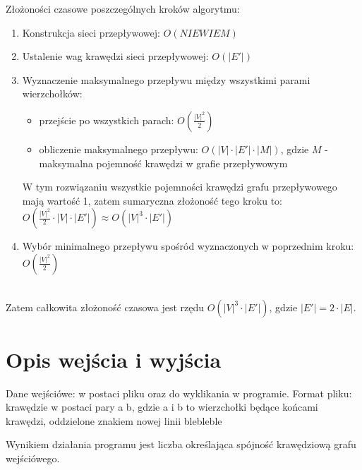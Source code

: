 \documentclass{article}
\begin{document}
Złożoności czasowe poszczególnych kroków algorytmu: 
\begin{enumerate}
\item Konstrukcja sieci przepływowej: $O(NIE WIEM)$
\item Ustalenie wag krawędzi sieci przepływowej: $O(|E'|)$
\item Wyznaczenie maksymalnego przepływu między wszystkimi parami wierzchołków: 
\begin{itemize}
    \item przejście po wszystkich parach: $O(\frac{|V|^{2}}{2})$
    \item obliczenie maksymalnego przepływu: $O(|V|\cdot |E'|\cdot |M|)$, gdzie $M$ - maksymalna pojemność krawędzi w grafie przepływowym
\end{itemize}
W tym rozwiązaniu wszystkie pojemności krawędzi grafu przepływowego mają wartość 1, zatem sumaryczna złożoność tego kroku to: $O(\frac{|V|^{2}}{2}\cdot|V|\cdot |E'|) \approx O(|V|^{3}\cdot |E'|)$
\item Wybór minimalnego przepływu spośród wyznaczonych w poprzednim kroku: $O(\frac{|V|^{2}}{2})$
\end{enumerate}\\
Zatem całkowita złożoność czasowa jest rzędu $O(|V|^{3}\cdot |E'|)$, gdzie $|E'|=2\cdot |E|$.\\


\section{Opis wejścia i wyjścia}
Dane wejściówe: w postaci pliku oraz do wyklikania w programie.
Format pliku: krawędzie w postaci pary a b, gdzie a i b to wierzchołki będące końcami krawędzi, oddzielone znakiem nowej linii blebleble


Wynikiem działania programu jest liczba określająca spójność krawędziową grafu wejściówego.
\end{document}

